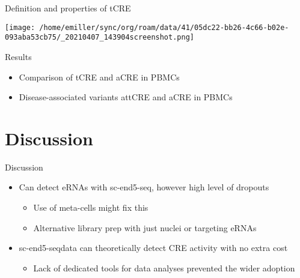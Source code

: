 \documentclass[bigger]{beamer}
\begin{document}
\begin{frame}[label={sec:org35e9b4c}]{Definition and properties of tCRE}
\begin{center}
\texttt{[image: /home/emiller/sync/org/roam/data/41/05dc22-bb26-4c66-b02e-093aba53cb75/\_20210407\_143904screenshot.png]}
\end{center}
\end{frame}
\begin{frame}[label={sec:org876254e}]{Results}
\begin{itemize}
\item Comparison of tCRE and aCRE in PBMCs
\item Disease-associated variants attCRE and aCRE in PBMCs
\end{itemize}
\end{frame}

\section{Discussion}
\label{sec:org4089da4}
\begin{frame}[label={sec:orgee7f9d2}]{Discussion}
\begin{itemize}
\item Can detect eRNAs with sc-end5-seq, however high level of dropouts
\begin{itemize}
\item Use of meta-cells might fix this
\item Alternative library prep with just nuclei or targeting eRNAs
\end{itemize}

\item sc-end5-seqdata can theoretically detect CRE activity with no extra cost
\begin{itemize}
\item Lack of dedicated tools for data analyses prevented the wider adoption
\end{itemize}
\end{itemize}
\end{frame}
\end{document}
